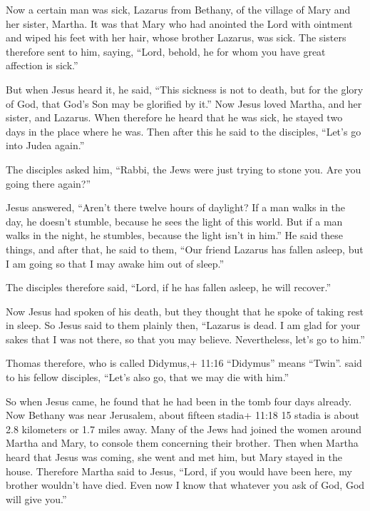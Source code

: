  Now a certain man was sick, Lazarus from Bethany, of the
village of Mary and her sister, Martha.  It was that Mary
who had anointed the Lord with ointment and wiped his feet with her
hair, whose brother Lazarus, was sick.  The sisters
therefore sent to him, saying, ``Lord, behold, he for whom you have
great affection is sick.''

 But when Jesus heard it, he said, ``This sickness is not to
death, but for the glory of God, that God's Son may be glorified by
it.''  Now Jesus loved Martha, and her sister, and Lazarus.
 When therefore he heard that he was sick, he stayed two
days in the place where he was.  Then after this he said to
the disciples, ``Let's go into Judea again.''

 The disciples asked him, ``Rabbi, the Jews were just trying
to stone you. Are you going there again?''

 Jesus answered, ``Aren't there twelve hours of daylight? If
a man walks in the day, he doesn't stumble, because he sees the light of
this world.  But if a man walks in the night, he stumbles,
because the light isn't in him.''  He said these things,
and after that, he said to them, ``Our friend Lazarus has fallen asleep,
but I am going so that I may awake him out of sleep.''

 The disciples therefore said, ``Lord, if he has fallen
asleep, he will recover.''

 Now Jesus had spoken of his death, but they thought that
he spoke of taking rest in sleep.  So Jesus said to them
plainly then, ``Lazarus is dead.  I am glad for your sakes
that I was not there, so that you may believe. Nevertheless, let's go to
him.''

 Thomas therefore, who is called Didymus,+ 11:16
``Didymus'' means ``Twin''. said to his fellow disciples, ``Let's also
go, that we may die with him.''

 So when Jesus came, he found that he had been in the tomb
four days already.  Now Bethany was near Jerusalem, about
fifteen stadia+ 11:18 15 stadia is about 2.8 kilometers or 1.7 miles
away.  Many of the Jews had joined the women around Martha
and Mary, to console them concerning their brother.  Then
when Martha heard that Jesus was coming, she went and met him, but Mary
stayed in the house.  Therefore Martha said to Jesus,
``Lord, if you would have been here, my brother wouldn't have died.
 Even now I know that whatever you ask of God, God will
give you.''

